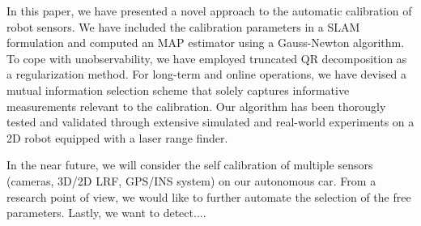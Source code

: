 In this paper, we have presented a novel approach to the automatic calibration
of robot sensors. We have included the calibration parameters in a SLAM
formulation and computed an MAP estimator using a Gauss-Newton algorithm. To
cope with unobservability, we have employed truncated QR decomposition as a
regularization method. For long-term and online operations, we have devised
a mutual information selection scheme that solely captures informative
measurements relevant to the calibration. Our algorithm has been thorougly
tested and validated through extensive simulated and real-world experiments on
a 2D robot equipped with a laser range finder.

In the near future, we will consider the self calibration of multiple sensors
(cameras, 3D/2D LRF, GPS/INS system) on our autonomous car. From a research
point of view, we would like to further automate the selection of the free
parameters. Lastly, we want to detect....
